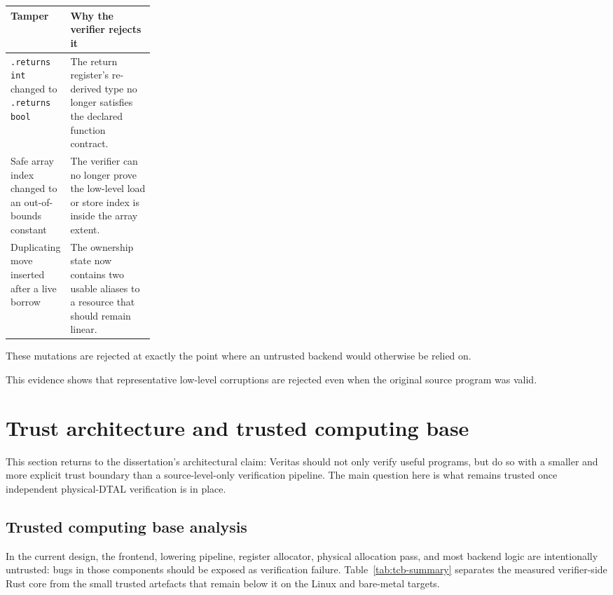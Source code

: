 \begin{center}
\small
\begin{tabularx}{0.96\linewidth}{@{}p{0.24\linewidth}X@{}}
\toprule
\textbf{Tamper} & \textbf{Why the verifier rejects it} \\
\midrule
\texttt{.returns int} changed to \texttt{.returns bool} & The return register's re-derived type no longer satisfies the declared function contract. \\
Safe array index changed to an out-of-bounds constant & The verifier can no longer prove the low-level load or store index is inside the array extent. \\
Duplicating move inserted after a live borrow & The ownership state now contains two usable aliases to a resource that should remain linear. \\
\bottomrule
\end{tabularx}
\end{center}

These mutations are rejected at exactly the point where an untrusted backend would otherwise be relied on.

This evidence shows that representative low-level corruptions are rejected even when the original source program was valid.


\section{Trust architecture and trusted computing base}\label{sec:tcb-eval}

This section returns to the dissertation's architectural claim: Veritas should not only verify useful programs, but do so with a smaller and more explicit trust boundary than a source-level-only verification pipeline. The main question here is what remains trusted once independent physical-DTAL verification is in place.

\subsection{Trusted computing base analysis}
In the current design, the frontend, lowering pipeline, register allocator, physical allocation pass, and most backend logic are intentionally untrusted: bugs in those components should be exposed as verification failure. Table~\ref{tab:tcb-summary} separates the measured verifier-side Rust core from the small trusted artefacts that remain below it on the Linux and bare-metal targets.

